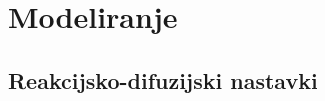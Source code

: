 \documentclass{beamer}
\begin{document}
\section{Modeliranje}

\subsection{Reakcijsko-difuzijski nastavki}

\end{document}

